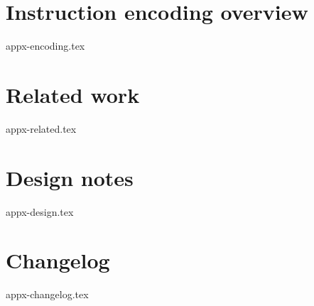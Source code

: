 \documentclass{article}
\begin{document}
\newpage
\section{Instruction encoding overview} 
\label{appx:encoding}

{appx-encoding.tex}

\newpage
\section{Related work}
\label{appx:related}

{appx-related.tex}

\newpage
\section{Design notes}
\label{appx:design}

{appx-design.tex}

\newpage
\section{Changelog}
\label{appx:changelog}

{appx-changelog.tex}

\end{document}
